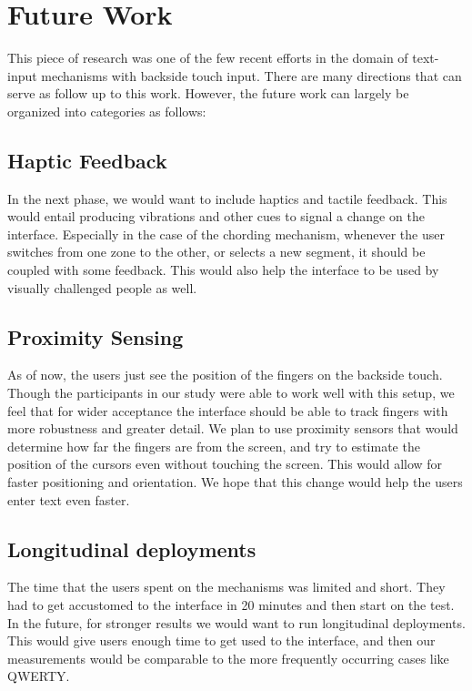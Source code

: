 \section{Future Work}

This piece of research was one of the few recent efforts in the domain
of text-input mechanisms with backside touch input. There are many
directions that can serve as follow up to this work. However, the
future work can largely be organized into categories as follows:

\subsection{Haptic Feedback}

In the next phase, we would want to include haptics and tactile
feedback. This would entail producing vibrations and other cues to
signal a change on the interface. Especially in the case of the
chording mechanism, whenever the user switches from one zone to the
other, or selects a new segment, it should be coupled with some
feedback. This would also help the interface to be used by visually
challenged people as well.

\subsection{Proximity Sensing}

As of now, the users just see the position of the fingers on the
backside touch. Though the participants in our study were able to work
well with this setup, we feel that for wider acceptance the interface
should be able to track fingers with more robustness and greater
detail. We plan to use proximity sensors that would determine how far
the fingers are from the screen, and try to estimate the position of
the cursors even without touching the screen. This would allow for
faster positioning and orientation. We hope that this change would
help the users enter text even faster.

\subsection{Longitudinal deployments} 

The time that the users spent on the mechanisms was limited and
short. They had to get accustomed to the interface in 20 minutes and
then start on the test. In the future, for stronger results we would
want to run longitudinal deployments. This would give users enough
time to get used to the interface, and then our measurements would be
comparable to the more frequently occurring cases like QWERTY.

